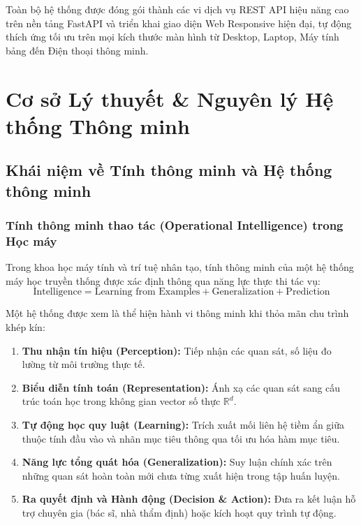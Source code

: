\documentclass[12pt,a4paper]{report}
\begin{document}
Toàn bộ hệ thống được đóng gói thành các vi dịch vụ REST API hiệu năng cao trên nền tảng FastAPI và triển khai giao diện Web Responsive hiện đại, tự động thích ứng tối ưu trên mọi kích thước màn hình từ Desktop, Laptop, Máy tính bảng đến Điện thoại thông minh.

\newpage

\chapter{Cơ sở Lý thuyết \& Nguyên lý Hệ thống Thông minh}

\section{Khái niệm về Tính thông minh và Hệ thống thông minh}

\subsection{Tính thông minh thao tác (Operational Intelligence) trong Học máy}
Trong khoa học máy tính và trí tuệ nhân tạo, tính thông minh của một hệ thống máy học truyền thống được xác định thông qua năng lực thực thi tác vụ:
\begin{equation}
\text{Intelligence} = \text{Learning from Examples} + \text{Generalization} + \text{Prediction}
\end{equation}

Một hệ thống được xem là thể hiện hành vi thông minh khi thỏa mãn chu trình khép kín:
\begin{enumerate}[leftmargin=1.5em]
    \item \textbf{Thu nhận tín hiệu (Perception):} Tiếp nhận các quan sát, số liệu đo lường từ môi trường thực tế.
    \item \textbf{Biểu diễn tính toán (Representation):} Ánh xạ các quan sát sang cấu trúc toán học trong không gian vector số thực $\mathbb{R}^d$.
    \item \textbf{Tự động học quy luật (Learning):} Trích xuất mối liên hệ tiềm ẩn giữa thuộc tính đầu vào và nhãn mục tiêu thông qua tối ưu hóa hàm mục tiêu.
    \item \textbf{Năng lực tổng quát hóa (Generalization):} Suy luận chính xác trên những quan sát hoàn toàn mới chưa từng xuất hiện trong tập huấn luyện.
    \item \textbf{Ra quyết định và Hành động (Decision \& Action):} Đưa ra kết luận hỗ trợ chuyên gia (bác sĩ, nhà thẩm định) hoặc kích hoạt quy trình tự động.
\end{enumerate}
\end{document}
